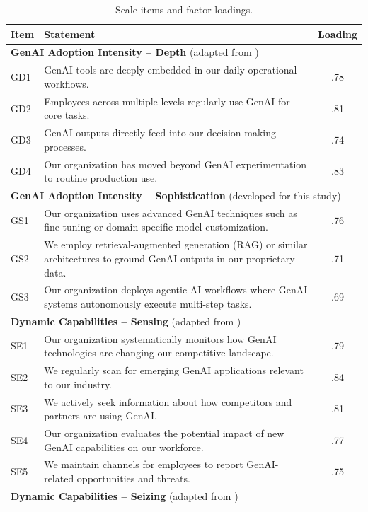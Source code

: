 \documentclass[12pt, a4paper]{article}
\begin{document}
\begin{table}[H]
\centering
\caption{Scale items and factor loadings.}
\label{tab:items}
\small
\begin{tabularx}{\textwidth}{p{0.6cm}Xc}
\toprule
\textbf{Item} & \textbf{Statement} & \textbf{Loading} \\
\midrule
\multicolumn{3}{l}{\textbf{GenAI Adoption Intensity -- Depth} (adapted from \citealt{Chatterjee2021})} \\
GD1 & GenAI tools are deeply embedded in our daily operational workflows. & .78 \\
GD2 & Employees across multiple levels regularly use GenAI for core tasks. & .81 \\
GD3 & GenAI outputs directly feed into our decision-making processes. & .74 \\
GD4 & Our organization has moved beyond GenAI experimentation to routine production use. & .83 \\
\midrule
\multicolumn{3}{l}{\textbf{GenAI Adoption Intensity -- Sophistication} (developed for this study)} \\
GS1 & Our organization uses advanced GenAI techniques such as fine-tuning or domain-specific model customization. & .76 \\
GS2 & We employ retrieval-augmented generation (RAG) or similar architectures to ground GenAI outputs in our proprietary data. & .71 \\
GS3 & Our organization deploys agentic AI workflows where GenAI systems autonomously execute multi-step tasks. & .69 \\
\midrule
\multicolumn{3}{l}{\textbf{Dynamic Capabilities -- Sensing} (adapted from \citealt{Pavlou2011})} \\
SE1 & Our organization systematically monitors how GenAI technologies are changing our competitive landscape. & .79 \\
SE2 & We regularly scan for emerging GenAI applications relevant to our industry. & .84 \\
SE3 & We actively seek information about how competitors and partners are using GenAI. & .81 \\
SE4 & Our organization evaluates the potential impact of new GenAI capabilities on our workforce. & .77 \\
SE5 & We maintain channels for employees to report GenAI-related opportunities and threats. & .75 \\
\midrule
\multicolumn{3}{l}{\textbf{Dynamic Capabilities -- Seizing} (adapted from \citealt{Pavlou2011})} \\

\end{tabularx}
\end{table}
\end{document}
